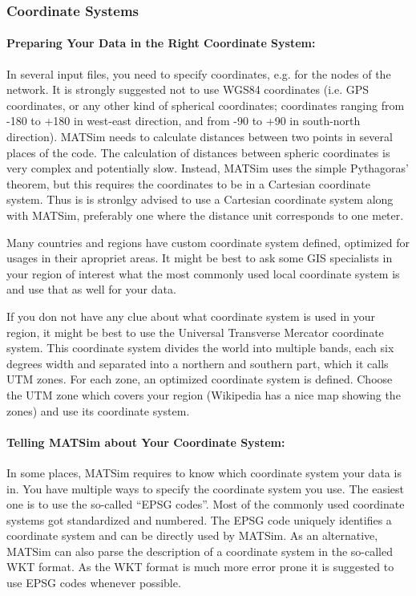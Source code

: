 \subsubsection{Coordinate Systems}
\label{sec:coordinatesystems}
\paragraph{Preparing Your Data in the Right Coordinate System:}
In several input files, you need to specify coordinates, e.g. for the nodes of the network. It is strongly suggested not to use WGS84 coordinates (i.e. GPS coordinates, or any other kind of spherical coordinates; coordinates ranging from -180 to +180 in west-east direction, and from -90 to +90 in south-north direction). MATSim needs to calculate distances between two points in several places of the code. The calculation of distances between spheric coordinates is very complex and potentially slow. Instead, MATSim uses the simple Pythagoras' theorem, but this requires the coordinates to be in a Cartesian coordinate system. Thus is is stronlgy advised to use a Cartesian coordinate system along with MATSim, preferably one where the distance unit corresponds to one meter.

Many countries and regions have custom coordinate system defined, optimized for usages in their apropriet areas. It might be best to ask some GIS specialists in your region of interest what the most commonly used local coordinate system is and use that as well for your data.

If you don not have any clue about what coordinate system is used in your region, it might be best to use the Universal Transverse Mercator coordinate system. This coordinate system divides the world into multiple bands, each six degrees width and separated into a northern and southern part, which it calls UTM zones. For each zone, an optimized coordinate system is defined. Choose the UTM zone which covers your region (Wikipedia has a nice map showing the zones) and use its coordinate system. 

\paragraph{Telling MATSim about Your Coordinate System:}
In some places, MATSim requires to know which coordinate system your data is in. You have multiple ways to specify the coordinate system you use. The easiest one is to use the so-called ``EPSG codes''. Most of the commonly used coordinate systems got standardized and numbered. The EPSG code uniquely identifies a coordinate system and can be directly used by MATSim. As an alternative, MATSim can also parse the description of a coordinate system in the so-called WKT format. As the WKT format is much more error prone it is suggested to use EPSG codes whenever possible.


